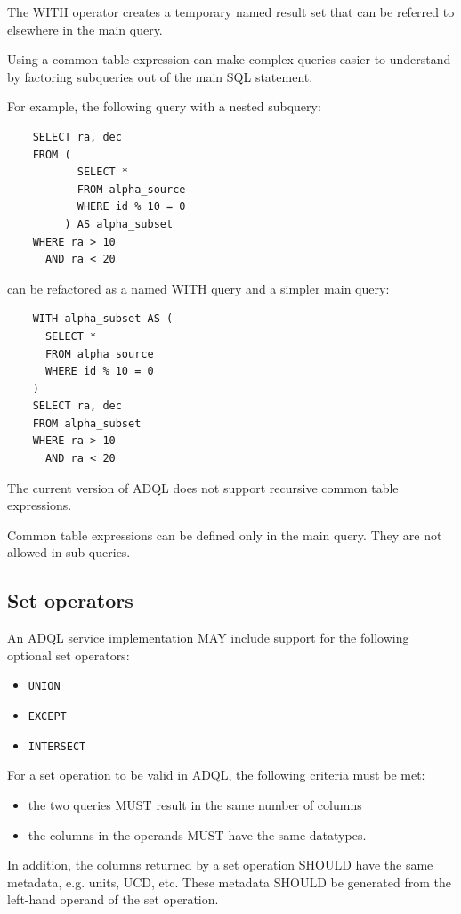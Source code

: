 \documentclass[11pt,a4paper]{ivoa}
\begin{document}
The WITH operator creates a temporary named result set that can be referred
to elsewhere in the main query.

Using a common table expression can make complex queries easier to understand
by factoring subqueries out of the main SQL statement.

For example, the following query with a nested subquery:
\begin{verbatim}
    SELECT ra, dec
    FROM (
           SELECT *
           FROM alpha_source
           WHERE id % 10 = 0
         ) AS alpha_subset
    WHERE ra > 10
      AND ra < 20
\end{verbatim}
\noindent
can be refactored as a named WITH query and a simpler main query:
\begin{verbatim}
    WITH alpha_subset AS (
      SELECT *
      FROM alpha_source
      WHERE id % 10 = 0
    )
    SELECT ra, dec
    FROM alpha_subset
    WHERE ra > 10
      AND ra < 20
\end{verbatim}

The current version of ADQL does not support recursive common table expressions.

Common table expressions can be defined only in the main
query. They are not allowed in sub-queries.

\subsection{Set operators}
\label{sec:set.operators}

An ADQL service implementation MAY include support for the following optional
set operators:

\begin{itemize}
    \item \verb:UNION:
    \item \verb:EXCEPT:
    \item \verb:INTERSECT:
\end{itemize}

For a set operation to be valid in ADQL, the following criteria must be met:
\begin{itemize}
    \item the two queries MUST result in the same number of columns
    \item the columns in the operands MUST have the same datatypes.
\end{itemize}

In addition, the columns returned by a set operation SHOULD have the same
metadata, e.g. units, UCD, etc. These metadata SHOULD be generated from the
left-hand operand of the set operation.
\end{document}
